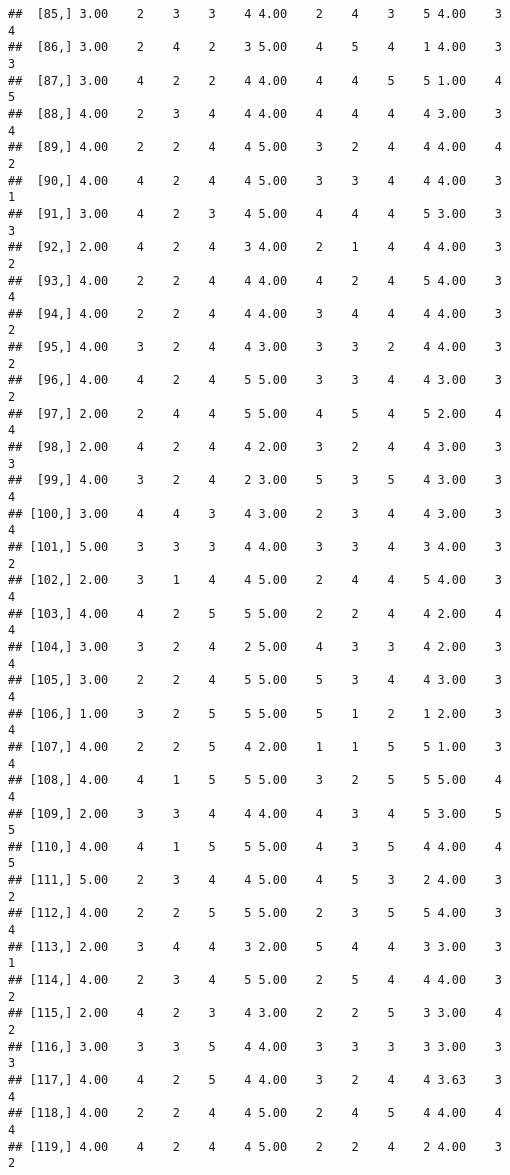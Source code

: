 \documentclass[]{article}
\begin{document}
\begin{verbatim}
##  [85,] 3.00    2    3    3    4 4.00    2    4    3    5 4.00    3    4
##  [86,] 3.00    2    4    2    3 5.00    4    5    4    1 4.00    3    3
##  [87,] 3.00    4    2    2    4 4.00    4    4    5    5 1.00    4    5
##  [88,] 4.00    2    3    4    4 4.00    4    4    4    4 3.00    3    4
##  [89,] 4.00    2    2    4    4 5.00    3    2    4    4 4.00    4    2
##  [90,] 4.00    4    2    4    4 5.00    3    3    4    4 4.00    3    1
##  [91,] 3.00    4    2    3    4 5.00    4    4    4    5 3.00    3    3
##  [92,] 2.00    4    2    4    3 4.00    2    1    4    4 4.00    3    2
##  [93,] 4.00    2    2    4    4 4.00    4    2    4    5 4.00    3    4
##  [94,] 4.00    2    2    4    4 4.00    3    4    4    4 4.00    3    2
##  [95,] 4.00    3    2    4    4 3.00    3    3    2    4 4.00    3    2
##  [96,] 4.00    4    2    4    5 5.00    3    3    4    4 3.00    3    2
##  [97,] 2.00    2    4    4    5 5.00    4    5    4    5 2.00    4    4
##  [98,] 2.00    4    2    4    4 2.00    3    2    4    4 3.00    3    3
##  [99,] 4.00    3    2    4    2 3.00    5    3    5    4 3.00    3    4
## [100,] 3.00    4    4    3    4 3.00    2    3    4    4 3.00    3    4
## [101,] 5.00    3    3    3    4 4.00    3    3    4    3 4.00    3    2
## [102,] 2.00    3    1    4    4 5.00    2    4    4    5 4.00    3    4
## [103,] 4.00    4    2    5    5 5.00    2    2    4    4 2.00    4    4
## [104,] 3.00    3    2    4    2 5.00    4    3    3    4 2.00    3    4
## [105,] 3.00    2    2    4    5 5.00    5    3    4    4 3.00    3    4
## [106,] 1.00    3    2    5    5 5.00    5    1    2    1 2.00    3    4
## [107,] 4.00    2    2    5    4 2.00    1    1    5    5 1.00    3    4
## [108,] 4.00    4    1    5    5 5.00    3    2    5    5 5.00    4    4
## [109,] 2.00    3    3    4    4 4.00    4    3    4    5 3.00    5    5
## [110,] 4.00    4    1    5    5 5.00    4    3    5    4 4.00    4    5
## [111,] 5.00    2    3    4    4 5.00    4    5    3    2 4.00    3    2
## [112,] 4.00    2    2    5    5 5.00    2    3    5    5 4.00    3    4
## [113,] 2.00    3    4    4    3 2.00    5    4    4    3 3.00    3    1
## [114,] 4.00    2    3    4    5 5.00    2    5    4    4 4.00    3    2
## [115,] 2.00    4    2    3    4 3.00    2    2    5    3 3.00    4    2
## [116,] 3.00    3    3    5    4 4.00    3    3    3    3 3.00    3    3
## [117,] 4.00    4    2    5    4 4.00    3    2    4    4 3.63    3    4
## [118,] 4.00    2    2    4    4 5.00    2    4    5    4 4.00    4    4
## [119,] 4.00    4    2    4    4 5.00    2    2    4    2 4.00    3    2

\end{verbatim}
\end{document}
